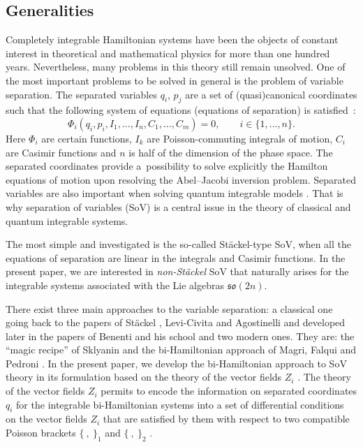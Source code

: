 \documentclass[pdftex]{sigma}
\numberwithin{equation}{section}
\begin{document}
\subsection{Generalities}
Completely integrable Hamiltonian systems have been the objects of constant interest in theoretical and mathematical physics for more than one hundred years. Nevertheless, many problems in this theory still remain unsolved. One of the most important problems to be solved in general is the problem of variable separation. The separated variables $q_i$, $p_j$ are a set of (quasi)canonical coordinates such that the following system of equations (equations of separation) is satisfied~\cite{SklSep}:
\[%
 \Phi_i(q_i, p_i,I_1, \dots ,I_n, C_1, \dots ,C_m) = 0, \qquad i\in \{1,\dots, n\}.
 \]
Here $\Phi_i$ are certain functions, $I_k$ are Poisson-commuting integrals of motion, $C_i$ are Casimir functions
and $n$ is half of the
dimension of the phase space.
The separated coordinates provide a~possibility to solve explicitly the Hamilton equations of motion upon resolving the Abel--Jacobi inversion problem. Separated variables are also important when solving quantum
integrable models \cite{SklSep}. That is why separation of variables (SoV) is a central issue in the theory of classical and quantum integrable systems.

 The most simple and investigated is the so-called St\"ackel-type SoV, when all the equations of separation are linear in the integrals and Casimir functions. In the present paper, we are interested in {\it non-St\"ackel} SoV that naturally arises for the integrable systems associated with the Lie algebras $\mathfrak{so}(2n)$.

There exist three main approaches to the variable separation: a classical one going back to the papers of St\"ackel \cite{Sta1,Sta2}, Levi-Civita \cite{Levi} and Agostinelli \cite{Agost} and developed later in the papers of Benenti and his school \cite{Benenti, Chanu1,Chanu2} and two modern ones. They are: the
 ``magic recipe'' of Sklyanin \cite{SklSep} and the bi-Hamiltonian approach of Magri, Falqui and Pedroni \cite{MFP,FP,FP2}.
 In the present paper, we develop the bi-Hamiltonian approach to SoV theory in its formulation based on the theory of the vector fields $Z_i$ \cite{MFP,FP,FP2}.
The theory of the vector fields $Z_i$ permits to encode the information on separated coordinates $q_i$ for the integrable bi-Hamiltonian systems into a set of differential conditions on the vector fields $Z_i$ that are satisfied by them with respect to two compatible Poisson brackets $\{\ ,\ \}_1$ and $\{\ ,\ \}_2$ \cite{MFP,FP,FP2}.
\end{document}

